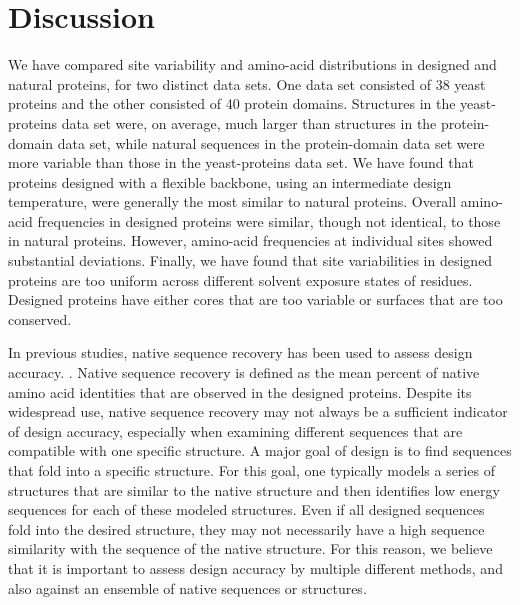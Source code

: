 \documentclass[12pt]{article}
\begin{document}
\section{Discussion}

We have compared site variability and amino-acid distributions in designed and natural proteins, for two distinct data sets. One data set consisted of 38 yeast proteins and the other consisted of 40 protein domains. Structures in the yeast-proteins data set were, on average, much larger than structures in the protein-domain data set, while natural sequences in the protein-domain data set were more variable than those in the yeast-proteins data set. We have found that proteins designed with a flexible backbone, using an intermediate design temperature, were generally the most similar to natural proteins. Overall amino-acid frequencies in designed proteins were similar, though not identical, to those in natural proteins. However, amino-acid frequencies at individual sites showed substantial deviations. Finally, we have found that site variabilities in designed proteins are too uniform across different solvent exposure states of residues. Designed proteins have either cores that are too variable or surfaces that are too conserved.

In previous studies, native sequence recovery has been used to assess design accuracy. \citep{Ganinza2012, Kuhlman2000}. Native sequence recovery is defined as the mean percent of native amino acid identities that are observed in the designed proteins. Despite its widespread use, native sequence recovery may not always be a sufficient indicator of design accuracy, especially when examining different sequences that are compatible with one specific structure. A major goal of design is to find sequences that fold into a specific structure. For this goal, one typically models a series of structures that are similar to the native structure and then identifies low energy sequences for each of these modeled structures. Even if all designed sequences fold into the desired structure, they may not necessarily have a high sequence similarity with the sequence of the native structure. For this reason, we believe that it is important to assess design accuracy by multiple different methods, and also against an ensemble of native sequences or structures.
\end{document}
